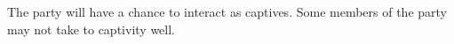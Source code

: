 The party will have a chance to interact as captives.
Some members of the party may not take to captivity well.
